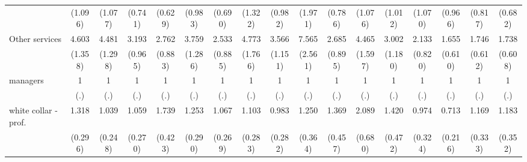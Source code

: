 {\begin{tabular}{l*{16}{c}}
                    &     (1.096)         &     (1.077)         &     (0.741)         &     (0.629)         &     (0.983)         &     (0.690)         &     (1.322)         &     (0.982)         &     (1.971)         &     (0.786)         &     (1.076)         &     (1.012)         &     (1.070)         &     (0.966)         &     (0.817)         &     (0.682)         \\
[1em]
Other services      &       4.603\sym{***}&       4.481\sym{***}&       3.193\sym{***}&       2.762\sym{**} &       3.759\sym{***}&       2.533\sym{**} &       4.773\sym{***}&       3.566\sym{***}&       7.565\sym{***}&       2.685\sym{**} &       4.465\sym{***}&       3.002\sym{**} &       2.133\sym{*}  &       1.655         &       1.746         &       1.738         \\
                    &     (1.358)         &     (1.298)         &     (0.965)         &     (0.883)         &     (1.286)         &     (0.885)         &     (1.766)         &     (1.151)         &     (2.561)         &     (0.895)         &     (1.597)         &     (1.180)         &     (0.820)         &     (0.610)         &     (0.612)         &     (0.608)         \\
[1em]
managers            &           1         &           1         &           1         &           1         &           1         &           1         &           1         &           1         &           1         &           1         &           1         &           1         &           1         &           1         &           1         &           1         \\
                    &         (.)         &         (.)         &         (.)         &         (.)         &         (.)         &         (.)         &         (.)         &         (.)         &         (.)         &         (.)         &         (.)         &         (.)         &         (.)         &         (.)         &         (.)         &         (.)         \\
[1em]
white collar - prof.&       1.318         &       1.039         &       1.059         &       1.739\sym{*}  &       1.253         &       1.067         &       1.103         &       0.983         &       1.250         &       1.369         &       2.089\sym{*}  &       1.420         &       0.974         &       0.713         &       1.169         &       1.183         \\
                    &     (0.296)         &     (0.248)         &     (0.270)         &     (0.423)         &     (0.290)         &     (0.269)         &     (0.283)         &     (0.282)         &     (0.364)         &     (0.457)         &     (0.680)         &     (0.472)         &     (0.324)         &     (0.216)         &     (0.333)         &     (0.352)         \\

\end{tabular}}
